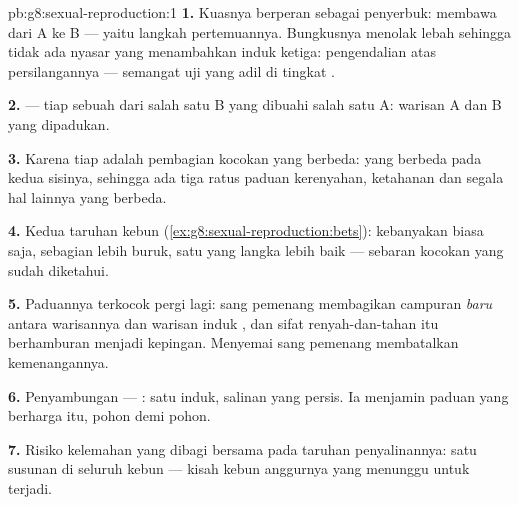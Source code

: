 \begin{solution}{pb:g8:sexual-reproduction:1}
\textbf{1.} Kuasnya berperan sebagai penyerbuk: membawa  
dari A ke  B --- yaitu langkah pertemuannya. Bungkusnya menolak
lebah sehingga tidak ada  nyasar yang menambahkan induk
ketiga: pengendalian atas persilangannya --- semangat uji yang adil di
tingkat .

\textbf{2.}  --- tiap  sebuah  dari salah satu  B yang dibuahi salah satu   A: warisan A dan B
yang dipadukan.

\textbf{3.} Karena tiap  adalah pembagian kocokan yang berbeda:
 yang berbeda pada kedua sisinya, sehingga ada tiga ratus paduan
kerenyahan, ketahanan dan segala hal lainnya yang berbeda.

\textbf{4.} Kedua taruhan kebun 
(\cref{ex:g8:sexual-reproduction:bets}): kebanyakan  biasa
saja, sebagian lebih buruk, satu yang langka lebih baik --- sebaran
kocokan yang sudah diketahui.

\textbf{5.} Paduannya terkocok pergi lagi:  sang pemenang
membagikan campuran \emph{baru} antara warisannya dan warisan induk
, dan sifat renyah-dan-tahan itu berhamburan menjadi
kepingan. Menyemai sang pemenang membatalkan kemenangannya.

\textbf{6.} Penyambungan --- : satu induk,
salinan yang persis. Ia menjamin paduan yang berharga itu, pohon demi
pohon.

\textbf{7.} Risiko kelemahan yang dibagi bersama pada taruhan
penyalinannya: satu susunan di seluruh kebun  --- kisah kebun
anggurnya yang menunggu untuk terjadi.


\end{solution}
